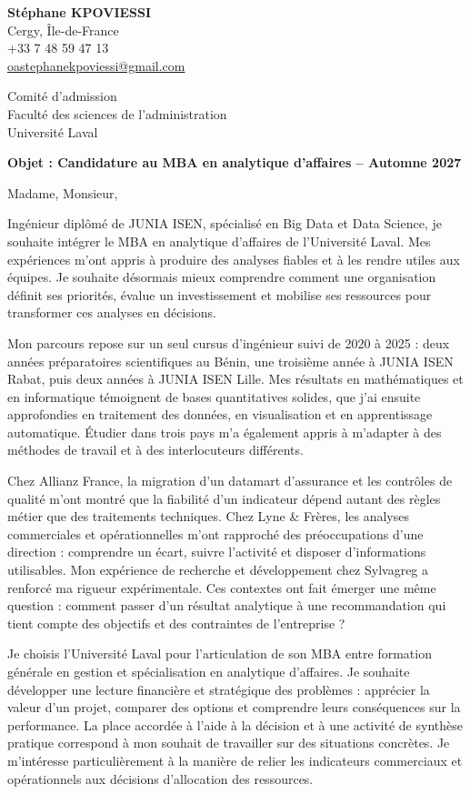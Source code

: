 \documentclass[12pt,a4paper]{article}
\begin{document}
\thispagestyle{empty}
\textbf{Stéphane KPOVIESSI}\\
{\small Cergy, Île-de-France\\
+33 7 48 59 47 13\\
\href{mailto:oastephanekpoviessi@gmail.com}{oastephanekpoviessi@gmail.com}}

\vspace{0.4em}
Comité d'admission\\
Faculté des sciences de l'administration\\
Université Laval

\vspace{0.3em}
\textbf{Objet : Candidature au MBA en analytique d'affaires -- Automne 2027}

Madame, Monsieur,

Ingénieur diplômé de JUNIA ISEN, spécialisé en Big Data et Data Science, je souhaite intégrer le MBA en analytique d'affaires de l'Université Laval. Mes expériences m'ont appris à produire des analyses fiables et à les rendre utiles aux équipes. Je souhaite désormais mieux comprendre comment une organisation définit ses priorités, évalue un investissement et mobilise ses ressources pour transformer ces analyses en décisions.

Mon parcours repose sur un seul cursus d'ingénieur suivi de 2020 à 2025 : deux années préparatoires scientifiques au Bénin, une troisième année à JUNIA ISEN Rabat, puis deux années à JUNIA ISEN Lille. Mes résultats en mathématiques et en informatique témoignent de bases quantitatives solides, que j'ai ensuite approfondies en traitement des données, en visualisation et en apprentissage automatique. Étudier dans trois pays m'a également appris à m'adapter à des méthodes de travail et à des interlocuteurs différents.

Chez Allianz France, la migration d'un datamart d'assurance et les contrôles de qualité m'ont montré que la fiabilité d'un indicateur dépend autant des règles métier que des traitements techniques. Chez Lyne \& Frères, les analyses commerciales et opérationnelles m'ont rapproché des préoccupations d'une direction : comprendre un écart, suivre l'activité et disposer d'informations utilisables. Mon expérience de recherche et développement chez Sylvagreg a renforcé ma rigueur expérimentale. Ces contextes ont fait émerger une même question : comment passer d'un résultat analytique à une recommandation qui tient compte des objectifs et des contraintes de l'entreprise ?

Je choisis l'Université Laval pour l'articulation de son MBA entre formation générale en gestion et spécialisation en analytique d'affaires. Je souhaite développer une lecture financière et stratégique des problèmes : apprécier la valeur d'un projet, comparer des options et comprendre leurs conséquences sur la performance. La place accordée à l'aide à la décision et à une activité de synthèse pratique correspond à mon souhait de travailler sur des situations concrètes. Je m'intéresse particulièrement à la manière de relier les indicateurs commerciaux et opérationnels aux décisions d'allocation des ressources.
\end{document}
